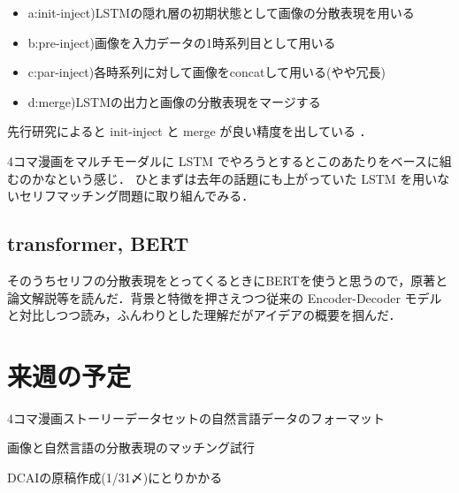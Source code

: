 \documentclass[twocolumn]{ujarticle}   %
\begin{document}
	\begin{itemize}
		\item{a:init-inject)}LSTMの隠れ層の初期状態として画像の分散表現を用いる
		\item{b:pre-inject)}画像を入力データの1時系列目として用いる
		\item{c:par-inject)}各時系列に対して画像をconcatして用いる(やや冗長)
		\item{d:merge)}LSTMの出力と画像の分散表現をマージする
	\end{itemize}
	先行研究によると init-inject と merge が良い精度を出している \cite{DBLP:journals/corr/TantiGC17}．

	4コマ漫画をマルチモーダルに LSTM でやろうとするとこのあたりをベースに組むのかなという感じ．
	ひとまずは去年の話題にも上がっていた LSTM を用いないセリフマッチング問題に取り組んでみる．

	\subsection{transformer, BERT}
	そのうちセリフの分散表現をとってくるときにBERTを使うと思うので，原著と論文解説等を読んだ．背景と特徴を押さえつつ従来の Encoder-Decoder モデルと対比しつつ読み，ふんわりとした理解だがアイデアの概要を掴んだ．

	\section{来週の予定}\noindent
	\begin{itemize}{
		\item{4コマ漫画ストーリーデータセットの自然言語データのフォーマット}
		\item{画像と自然言語の分散表現のマッチング試行}
		\item{DCAIの原稿作成(1/31〆)にとりかかる}
	}
	\end{itemize}

	
	
\end{document}

